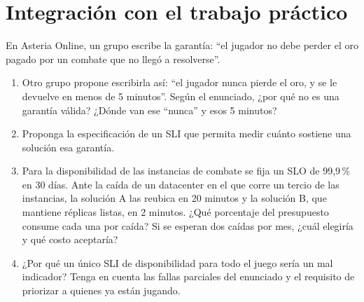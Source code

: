 \documentclass[variant=guia,cover=institutional,mode=screen]{ua-engineering-v6-article}
\begin{document}
\section{Integración con el trabajo práctico}
\begin{uaexercise}
En Asteria Online, un grupo escribe la garantía: ``el jugador no debe perder el oro pagado por un combate que no llegó a resolverse''.
\begin{enumerate}
\item Otro grupo propone escribirla así: ``el jugador nunca pierde el oro, y se le devuelve en menos de 5 minutos''. Según el enunciado, ¿por qué no es una garantía válida? ¿Dónde van ese ``nunca'' y esos 5 minutos?
\item Proponga la especificación de un SLI que permita medir cuánto sostiene una solución esa garantía.
\item Para la disponibilidad de las instancias de combate se fija un SLO de 99,9\,\% en 30 días. Ante la caída de un datacenter en el que corre un tercio de las instancias, la solución A las reubica en 20 minutos y la solución B, que mantiene réplicas listas, en 2 minutos. ¿Qué porcentaje del presupuesto consume cada una por caída? Si se esperan dos caídas por mes, ¿cuál elegiría y qué costo aceptaría?
\item ¿Por qué un único SLI de disponibilidad para todo el juego sería un mal indicador? Tenga en cuenta las fallas parciales del enunciado y el requisito de priorizar a quienes ya están jugando.
\end{enumerate}
\end{uaexercise}
\end{document}
